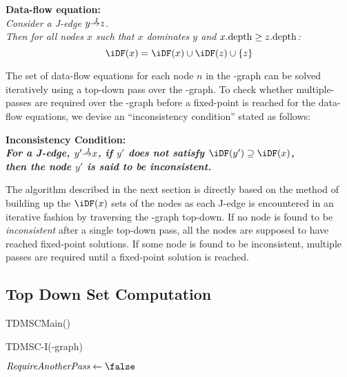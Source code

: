 {%
\begin{center}
  \textbf{Data-flow equation:}\\
  {\it 
  Consider a J-edge $y \st{J} z$.\\
  Then for all nodes $x$ such that $x$ dominates $y$ and $x.\textrm{depth} \geq z.\textrm{depth}$:
  $$\iDF(x) = \iDF(x) \cup \iDF(z) \cup \{z\}$$}
\end{center}

The set of data-flow equations for each node $n$ in the \DJ-graph can be solved iteratively using a top-down pass over the \DJ-graph. 
To check whether multiple-passes are required over the \DJ-graph before a fixed-point is reached for the data-flow equations, we devise an ``inconsistency condition'' stated as follows:

\begin{center}
\bf{Inconsistency Condition:}\\
\it{For a J-edge, $y' \st{J} x$, if $y'$ does not satisfy
$\iDF(y')\supseteq \iDF(x)$,\\ then the node $y'$ is said to be inconsistent}. 
\end{center}

The algorithm described in the next section is directly based on the method of building up the $\iDF(x)$ sets of the nodes as each J-edge is encountered in an iterative fashion by traversing the \DJ-graph top-down. 
If no node is found to be \emph{inconsistent} after a single top-down pass, all the nodes are supposed to have reached fixed-point solutions. 
If some node is found to be inconsistent, multiple passes are required until a fixed-point solution is reached.


\subsection{Top Down \iDF Set Computation}

\begin{procedure}
  \caption{TDMSCMain()}
  \label{proc:tdmscmain}
\end{procedure}

\begin{function}
  \caption{TDMSC-I(\DJ-graph)}
  \label{proc:alt:tdmscI}
  $\textit{RequireAnotherPass} \gets \false$\;


\end{function}}
